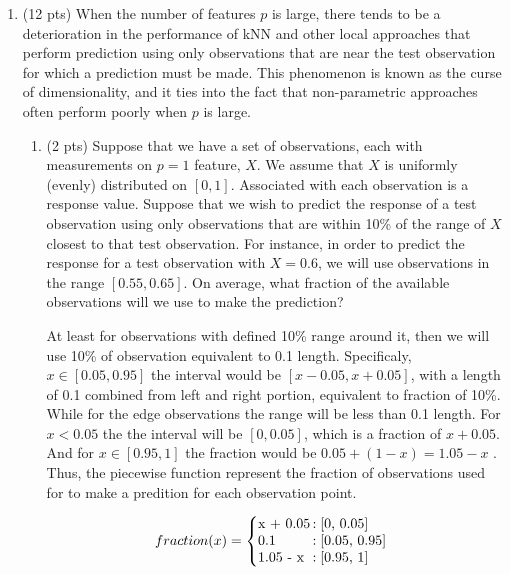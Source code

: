 \documentclass[a4paper]{article}
\theoremstyle{definition}
\newenvironment{soln}{
    \leavevmode\color{blue}\ignorespaces
}{}
\begin{document}
\begin{enumerate}
  \item (12 pts) When the number of features $p$ is large, there tends to be a deterioration in the performance of kNN and other local approaches that perform prediction using only observations that are near the test observation for which a prediction must be made. This phenomenon is known as the curse of dimensionality, and it ties into the fact that non-parametric approaches often perform poorly when $p$ is large.

        \begin{enumerate}
          \item (2 pts) Suppose that we have a set of observations, each with measurements on $p =1$ feature, $X$. We assume that $X$ is uniformly (evenly) distributed on $[0, 1]$. Associated with each observation is a response value. Suppose that we wish to predict the response of a test observation using only observations that are within 10\% of the range of $X$ closest to that test observation. For instance, in order to predict the response for a test observation with $X =0.6$, we will use observations in the range $[0.55, 0.65]$. On average, what fraction of the available observations will we use to make the prediction?

                \begin{soln}
                  At least for observations with defined 10\% range around it, then we will use 10\% of observation equivalent to 0.1 length. Specificaly, $x \in [0.05, 0.95]$ the interval would be $[x-0.05, x+0.05]$, with a length of 0.1 combined from left and right portion, equivalent to fraction of 10\%.  \\
                  While for the edge observations the range will be less than 0.1 length. For $x<0.05$ the the interval will be $[0, 0.05]$, which is a fraction of $x+0.05$. And for $x \in [0.95, 1]$ the fraction would be $0.05+(1-x) = 1.05 - x$ . Thus, the piecewise function represent the fraction of observations used for to make a predition for each observation point.

                  \[
                    fraction(x) = \left\{
                    \begin{array}{@{}l@{\thinspace}l}
                      $x + 0.05$ & : \text{} \text{} $[0, 0.05]$    \\
                      $0.1$      & : \text{}  \text{}$[0.05, 0.95]$ \\
                      $1.05 - x$ & : \text{}  \text{}$[0.95, 1]$    \\
                    \end{array}
                    \right.
                  \]


\end{soln}
\end{enumerate}
\end{enumerate}
\end{document}
